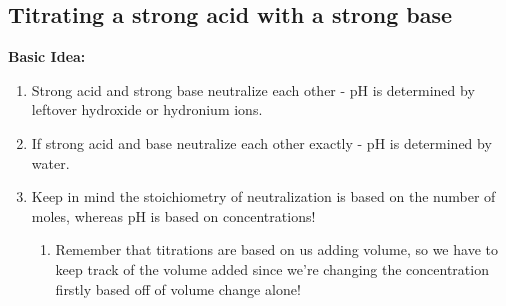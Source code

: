 \documentclass{article}  %
\begin{document}
\subsection*{Titrating a strong acid with a strong base}
\textbf{Basic Idea:}
\begin{enumerate}
    \item Strong acid and strong base neutralize each other - pH is determined by leftover hydroxide or hydronium ions.
    \item If strong acid and base neutralize each other exactly - pH is determined by water.
    \item Keep in mind the stoichiometry of neutralization is based on the number of moles, whereas pH is based on concentrations!
    \begin{enumerate}
        \item Remember that titrations are based on us adding volume, so we have to keep track of the volume added since we're changing the concentration firstly based off of volume change alone!
    \end{enumerate}
\end{enumerate}
\end{document}
